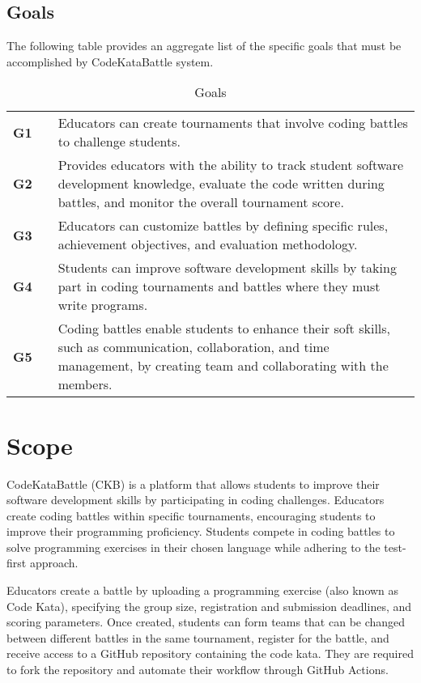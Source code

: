 \subsection{Goals}
The following table provides an aggregate list of the specific goals that must be accomplished by CodeKataBattle system.

\begin{table}[H]
    \centering
    \renewcommand{\arraystretch}{1.5}
    \begin{tabular}{l l p{12.5cm}}
        \hline
        \textbf{G1} &  & Educators can create tournaments that involve coding battles to challenge students.                                                                                          \\
        \textbf{G2} &  & Provides educators with the ability to track student software development knowledge, evaluate the code written during battles, and monitor the overall tournament score.     \\
        \textbf{G3} &  & Educators can customize battles by defining specific rules, achievement objectives, and evaluation methodology.                                                              \\
        \textbf{G4} &  & Students can improve software development skills by taking part in coding tournaments and battles where they must write programs.                                            \\
        \textbf{G5} &  & Coding battles enable students to enhance their soft skills, such as communication, collaboration, and time management, by creating team and collaborating with the members. \\
        \hline
    \end{tabular}
    \caption{Goals}
\end{table}

\section{Scope}
CodeKataBattle (CKB) is a platform that allows students to improve their software development skills by participating in coding challenges.
Educators create coding battles within specific tournaments, encouraging students to improve their programming proficiency.
Students compete in coding battles to solve programming exercises in their chosen language while adhering to the test-first approach.

Educators create a battle by uploading a programming exercise (also known as Code Kata), specifying the group size, registration and submission deadlines, and scoring parameters.
Once created, students can form teams that can be changed between different battles in the same tournament, register for the battle, and receive access to a GitHub repository containing the code kata.
They are required to fork the repository and automate their workflow through GitHub Actions.

